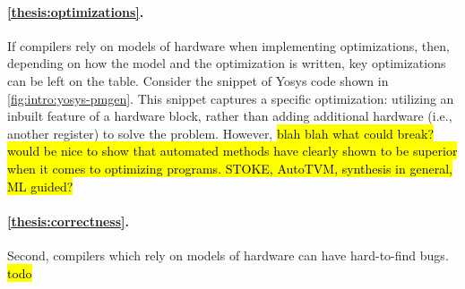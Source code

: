 \paragraph{\cref{thesis:optimizations}.}
If compilers rely on models
  of hardware
  when implementing optimizations,
  then, depending on how the model
  and the optimization is written,
  key optimizations can be left on the table.
Consider the snippet of Yosys code
  shown in
  \cref{fig:intro:yosys-pmgen}.
This snippet captures a specific optimization:
  utilizing an inbuilt feature of a hardware block,
  rather than adding additional hardware
  (i.e., another register) to solve the problem.
However,
  \hl{blah blah what could break?}
\hl{would be nice to show that automated methods have clearly shown
  to be superior when it comes to optimizing programs.
  STOKE, AutoTVM, synthesis in general, ML guided?}

\paragraph{\cref{thesis:correctness}.}
Second, compilers
  which rely on models of hardware
  can have hard-to-find bugs.
\hl{todo}

